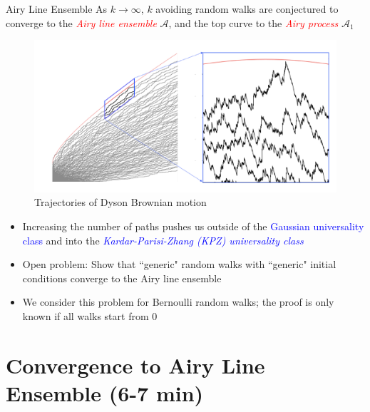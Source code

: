 \documentclass[9pt,t,dvipsnames]{beamer}
\begin{document}
\begin{frame}{Airy Line Ensemble}
As $k \to \infty$, $k$ avoiding random walks are conjectured to converge to the \textit{\textcolor{red}{Airy line ensemble}} $\mathcal{A}$, and the top curve to the \textit{\textcolor{red}{Airy process}} $\mathcal{A}_1$
\begin{figure}
	\includegraphics[height=0.25\textheight]{graphics/airy.png}
	\caption{Trajectories of Dyson Brownian motion}
\end{figure}

\begin{itemize}
	
	\item Increasing the number of paths pushes us outside of the \textcolor{blue}{Gaussian universality class} and into the \textcolor{blue}{\textit{Kardar-Parisi-Zhang (KPZ) universality class}}
	
	\item Open problem: Show that ``generic" random walks with ``generic" initial conditions converge to the Airy line ensemble
	
	\item We consider this problem for Bernoulli random walks; the proof is only known if all walks start from 0
	
\end{itemize}
\end{frame}


\section{Convergence to Airy Line Ensemble (6-7 min)}
\end{document}
